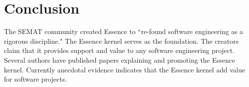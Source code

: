 \documentclass[preprint,12pt,3p]{elsarticle}
\begin{document}




\section{Conclusion}
\label{Conclusions}

The SEMAT community created Essence to ``re-found software engineering as a rigorous discipline." The Essence kernel serves as the foundation. The creators claim that it provides support and value to any software engineering project.  Several authors have published papers explaining and promoting the Essence kernel. Currently anecdotal evidence indicates that the Essence kernel add value for software projects. 
\end{document}
